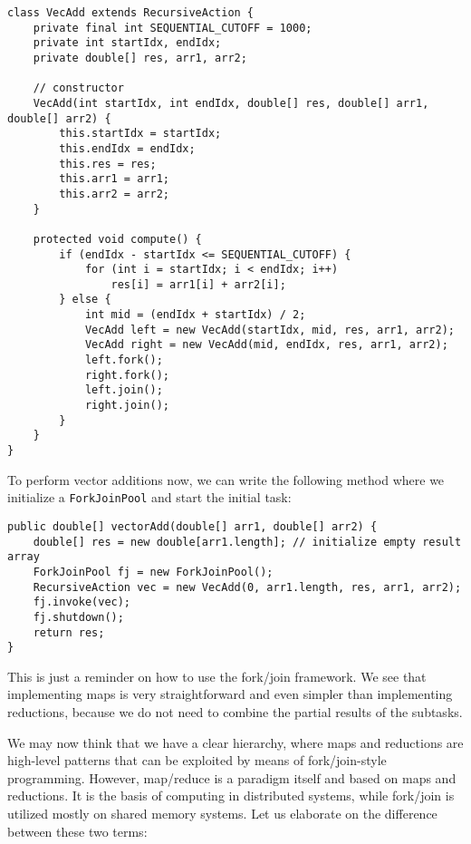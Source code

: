 \documentclass[main.tex]{subfiles}
\begin{document}
\begin{verbatim}
class VecAdd extends RecursiveAction {
    private final int SEQUENTIAL_CUTOFF = 1000;
    private int startIdx, endIdx;
    private double[] res, arr1, arr2;

    // constructor
    VecAdd(int startIdx, int endIdx, double[] res, double[] arr1, double[] arr2) {
        this.startIdx = startIdx;
        this.endIdx = endIdx;
        this.res = res;
        this.arr1 = arr1;
        this.arr2 = arr2;
    }

    protected void compute() {
        if (endIdx - startIdx <= SEQUENTIAL_CUTOFF) {
            for (int i = startIdx; i < endIdx; i++)
                res[i] = arr1[i] + arr2[i];
        } else {
            int mid = (endIdx + startIdx) / 2;
            VecAdd left = new VecAdd(startIdx, mid, res, arr1, arr2);
            VecAdd right = new VecAdd(mid, endIdx, res, arr1, arr2);
            left.fork();
            right.fork();
            left.join();
            right.join();
        }
    }
}
\end{verbatim}

\noindent To perform vector additions now, we can write the following method where we initialize a \texttt{ForkJoinPool} and start the initial task:

\begin{verbatim}
public double[] vectorAdd(double[] arr1, double[] arr2) {
    double[] res = new double[arr1.length]; // initialize empty result array
    ForkJoinPool fj = new ForkJoinPool();
    RecursiveAction vec = new VecAdd(0, arr1.length, res, arr1, arr2);
    fj.invoke(vec);
    fj.shutdown();
    return res;
}
\end{verbatim}

\noindent This is just a reminder on how to use the fork/join framework. We see that implementing maps is very straightforward and even simpler than implementing reductions, because we do not need to combine the partial results of the subtasks.

We may now think that we have a clear hierarchy, where maps and reductions are high-level patterns that can be exploited by means of fork/join-style programming. However, map/reduce is a paradigm itself and based on maps and reductions. It is the basis of computing in distributed systems, while fork/join is utilized mostly on shared memory systems. Let us elaborate on the difference between these two terms:
\end{document}
